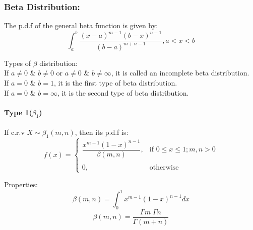 \documentclass[
10pt, %
a4paper, %
]{report}
\begin{document}
\newpage

\subsubsection*{Beta Distribution:}

The p.d.f of the general beta function is given by:
\[
\int_a^b \dfrac{(x-a)^{m-1}(b-x)^{n-1}}{(b-a)^{m+n-1}}, a<x<b
\]

Types of \(\beta\) distribution: \\
If \(a\neq 0\) \& \(b\neq 0\) or \(a\neq 0\) \& \(b \neq \infty\), it is called an incomplete beta distribution. \\
If \(a=0\) \& \(b=1\), it is the first type of beta distribution. \\
If \(a=0\) \& \(b=\infty\), it is the second type of beta distribution. \\

\paragraph*{Type 1(\(\beta_1\))}
If c.r.v \(X\sim \beta_1(m, n)\), then its p.d.f is:
\[
    f(x)= 
\begin{cases}
    \dfrac{x^{m-1}(1-x)^{n-1}}{\beta(m, n)}, & \text{if } 0\leq x \leq 1;m, n>0\\ \\
    0,                                     & \text{otherwise}
\end{cases}
\]

Properties:
\[
\beta(m, n) = \int_0^1 x^{m-1} (1-x)^{n-1} dx
\]
\[
\beta(m, n) = \frac{\Gamma m \; \Gamma n}{\Gamma (m+n)}
\]
\end{document}
